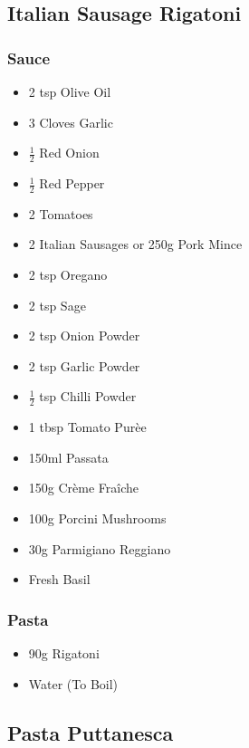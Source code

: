 \documentclass[11pt, english]{article}
\begin{document}
\newpage

	\subsection{Italian Sausage Rigatoni}

		\subsubsection*{Sauce}

	\begin{itemize}
	\setlength\itemsep{0cm}
		\item 2 tsp Olive Oil
		\item 3 Cloves Garlic
		\item $\frac{1}{2}$ Red Onion
		\item $\frac{1}{2}$ Red Pepper
		\item 2 Tomatoes
		\item 2 Italian Sausages or 250g Pork Mince
		\item 2 tsp Oregano
		\item 2 tsp Sage
		\item 2 tsp Onion Powder
		\item 2 tsp Garlic Powder
		\item $\frac{1}{2}$ tsp Chilli Powder
		\item 1 tbsp Tomato Pur\`{e}e
		\item 150ml Passata
		\item 150g Cr\`{e}me Fra\^{i}che
		\item 100g Porcini Mushrooms
		\item 30g Parmigiano Reggiano
		\item Fresh Basil
	\end{itemize}

		\subsubsection*{Pasta}

        \begin{itemize}
        \setlength\itemsep{0cm}
                \item 90g Rigatoni
                \item Water (To Boil)
        \end{itemize}

\newpage

	\subsection{Pasta Puttanesca}
\end{document}
